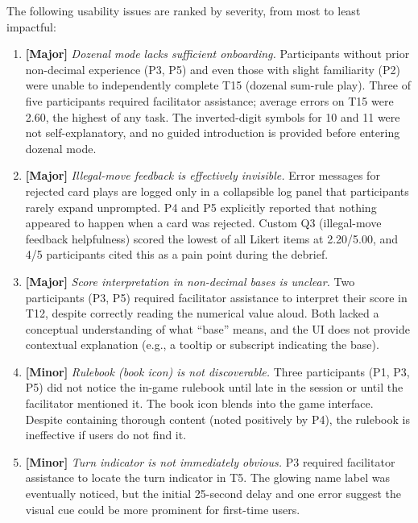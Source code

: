 \documentclass[12pt, titlepage]{article}
\begin{document}
The following usability issues are ranked by severity, from most to least impactful:

\begin{enumerate}
  \item \textbf{[Major]} \textit{Dozenal mode lacks sufficient onboarding.} Participants without prior non-decimal experience (P3, P5) and even those with slight familiarity (P2) were unable to independently complete T15 (dozenal sum-rule play). Three of five participants required facilitator assistance; average errors on T15 were 2.60, the highest of any task. The inverted-digit symbols for 10 and 11 were not self-explanatory, and no guided introduction is provided before entering dozenal mode.

  \item \textbf{[Major]} \textit{Illegal-move feedback is effectively invisible.} Error messages for rejected card plays are logged only in a collapsible log panel that participants rarely expand unprompted. P4 and P5 explicitly reported that nothing appeared to happen when a card was rejected. Custom Q3 (illegal-move feedback helpfulness) scored the lowest of all Likert items at 2.20/5.00, and 4/5 participants cited this as a pain point during the debrief.

  \item \textbf{[Major]} \textit{Score interpretation in non-decimal bases is unclear.} Two participants (P3, P5) required facilitator assistance to interpret their score in T12, despite correctly reading the numerical value aloud. Both lacked a conceptual understanding of what ``base'' means, and the UI does not provide contextual explanation (e.g., a tooltip or subscript indicating the base).

  \item \textbf{[Minor]} \textit{Rulebook (book icon) is not discoverable.} Three participants (P1, P3, P5) did not notice the in-game rulebook until late in the session or until the facilitator mentioned it. The book icon blends into the game interface. Despite containing thorough content (noted positively by P4), the rulebook is ineffective if users do not find it.

  \item \textbf{[Minor]} \textit{Turn indicator is not immediately obvious.} P3 required facilitator assistance to locate the turn indicator in T5. The glowing name label was eventually noticed, but the initial 25-second delay and one error suggest the visual cue could be more prominent for first-time users.
\end{enumerate}
\end{document}
